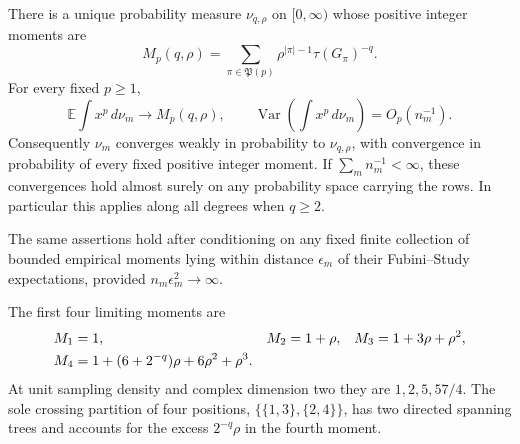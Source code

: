 \begin{theorem}
\label{thm:coherent-spectral-law}
There is a unique probability measure $\nu_{q,\rho}$ on $[0,\infty)$
whose positive integer moments are
\begin{equation}
 M_p(q,\rho)=
 \sum_{\pi\in\mathfrak P(p)}
       \rho^{|\pi|-1}\tau(G_\pi)^{-q}.
 \label{eq:coherent-tree-moments}
\end{equation}
For every fixed $p\geq1$,
\[
 \mathbb E\!\int x^p\,d\nu_m\longrightarrow M_p(q,\rho),
 \qquad
 \operatorname{Var}\!\left(\int x^p\,d\nu_m\right)=O_p(n_m^{-1}).
\]
Consequently $\nu_m$ converges weakly in probability to
$\nu_{q,\rho}$, with convergence in probability of every fixed
positive integer moment.  If $\sum_m n_m^{-1}<\infty$, these
convergences hold almost surely on any probability space carrying
the rows.  In particular this applies along all degrees when $q\geq2$.

The same assertions hold after conditioning on any fixed finite
collection of bounded empirical moments lying within distance
$\epsilon_m$ of their Fubini--Study expectations, provided
$n_m\epsilon_m^2\to\infty$.
\end{theorem}

The first four limiting moments are
\begin{align}
 M_1&=1,& M_2&=1+\rho,& M_3&=1+3\rho+\rho^2,\notag\\
 M_4&=1+(6+2^{-q})\rho+6\rho^2+\rho^3.
 \label{eq:coherent-first-moments}
\end{align}
At unit sampling density and complex dimension two they are
$1,2,5,57/4$.  The sole crossing partition of four positions,
$\{\{1,3\},\{2,4\}\}$, has two directed spanning trees and
accounts for the excess $2^{-q}\rho$ in the fourth moment.


